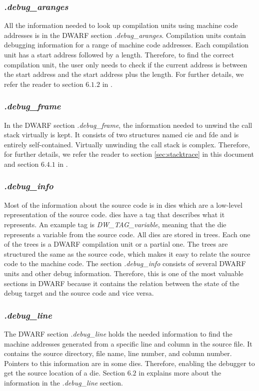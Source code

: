 \subsubsection{\emph{.debug\_aranges}}
All the information needed to look up compilation units using machine code addresses is in the \gls{DWARF} section \emph{.debug\_aranges}.
Compilation units contain debugging information for a range of machine code addresses.
Each compilation unit has a start address followed by a length.
Therefore, to find the correct compilation unit, the user only needs to check if the current address is between the start address and the start address plus the length.
For further details, we refer the reader to section $6.1.2$ in \cite{dwarf}.


\subsubsection{\emph{.debug\_frame}}
In the \gls{DWARF} section \emph{.debug\_frame}, the information needed to unwind the call stack virtually is kept.
It consists of two structures named \acrfull{cie} and \acrfull{fde} and is entirely self-contained.
Virtually unwinding the call stack is complex.
Therefore, for further details, we refer the reader to section \ref{sec:stacktrace} in this document and section $6.4.1$ in \cite{dwarf}.


\subsubsection{\emph{.debug\_info}}
Most of the information about the source code is in \glspl{die} which are a low-level representation of the source code.
\glspl{die} have a tag that describes what it represents.
An example tag is \emph{DW\_TAG\_variable}, meaning that the \gls{die} represents a variable from the source code.
All \glspl{die} are stored in trees.
Each one of the trees is a \gls{DWARF} compilation unit or a partial one.
The trees are structured the same as the source code, which makes it easy to relate the source code to the machine code.
The section \emph{.debug\_info} consists of several \gls{DWARF} units and other debug information.
Therefore, this is one of the most valuable sections in \gls{DWARF} because it contains the relation between the state of the debug target and the source code and vice versa.


\subsubsection{\emph{.debug\_line}}
The \gls{DWARF} section \emph{.debug\_line} holds the needed information to find the machine addresses generated from a specific line and column in the source file.
It contains the source directory, file name, line number, and column number.
Pointers to this information are in some \glspl{die}.
Therefore, enabling the debugger to get the source location of a \gls{die}.
Section $6.2$ in \cite{dwarf} explains more about the information in the \emph{.debug\_line} section.


